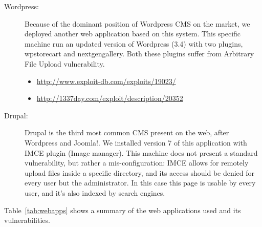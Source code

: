 \begin{description}
\item[Wordpress: ] Because of the dominant position of Wordpress CMS on the market, we deployed another web application based on this system. This specific machine run an updated version of Wordpress (3.4) with two plugins, wpstorecart and nextgengallery. Both these plugins suffer from Arbitrary File Upload vulnerability.

\begin{itemize}
\item
\url{http://www.exploit-db.com/exploits/19023/}
\item
\url{http://1337day.com/exploit/description/20352}
\end{itemize}

\item[Drupal: ] Drupal \cite{drupal} is the third most common CMS present on the web, after Wordpress and Joomla!. We installed version 7 of this application with IMCE plugin (Image manager). This machine does not present a standard vulnerability, but rather a mis-configuration: IMCE allows for remotely upload files inside a specific directory, and its access should be denied for every user but the administrator. In this case this page is usable by every user, and it's also indexed by search engines.
\end{description}

Table~\ref{tab:webapps} shows a summary of the web applications used and its vulnerabilities.


